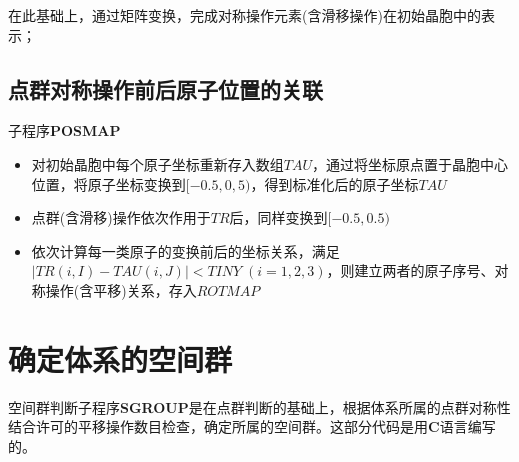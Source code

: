 \documentclass{article}      %
\begin{document}
在此基础上，通过矩阵变换，完成对称操作元素(含滑移操作)在初始晶胞中的表示；
\subsection{点群对称操作前后原子位置的关联}
子程序\textbf{POSMAP}\\
\begin{itemize}
	\item 对初始晶胞中每个原子坐标重新存入数组$\mathit{TAU}$，通过将坐标原点置于晶胞中心位置，将原子坐标变换到$[-0.5,0,5)$，得到标准化后的原子坐标$\mathit{TAU}$
		\item 点群(含滑移)操作依次作用于$\mathit{TR}$后，同样变换到$[-0.5,0.5)$
		\item 依次计算每一类原子的变换前后的坐标关系，满足$|\mathit{TR}(i,I)-\mathit{TAU}(i,J)|<\mathit{TINY}\;(i=1,2,3)$，则建立两者的原子序号、对称操作(含平移)关系，存入$\mathit{ROTMAP}$
\end{itemize}

\section{确定体系的空间群}
空间群判断子程序\textbf{SGROUP}是在点群判断的基础上，根据体系所属的点群对称性结合许可的平移操作数目检查，确定所属的空间群。这部分代码是用\textbf{C}语言编写的。
\end{document}
